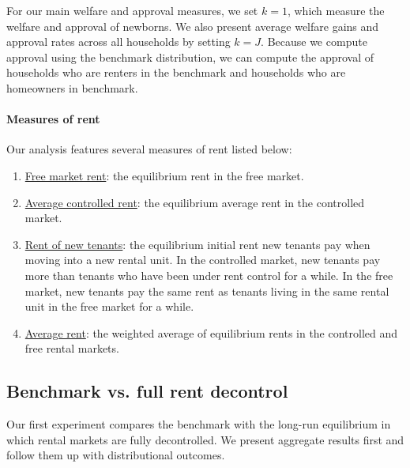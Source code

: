 \documentclass[parskip=full]{article}
\begin{document}
\noindent For our main welfare and approval measures, we set $k=1$, which measure the welfare and approval of newborns. We also present average welfare gains and approval rates across all households by setting $k=J$. Because we compute approval using the benchmark distribution, we can compute the approval of households who are renters in the benchmark and households who are homeowners in benchmark. 

\paragraph{Measures of rent} Our analysis features several measures of rent listed below: 

\begin{enumerate}
    \item \underline{Free market rent}: the equilibrium rent in the free market.
    \item \underline{Average controlled rent}: the equilibrium average rent in the controlled market.
    \item \underline{Rent of new tenants}: the equilibrium initial rent new tenants pay when moving into a new rental unit. In the controlled market, new tenants pay more than tenants who have been under rent control for a while. In the free market, new tenants pay the same rent as tenants living in the same rental unit in the free market for a while.
    \item \underline{Average rent}: the weighted average of equilibrium rents in the controlled and free rental markets.
\end{enumerate}

\subsection{Benchmark vs. full rent decontrol}\label{subsection:full_decontrol}
Our first experiment compares the benchmark with the long-run equilibrium in which rental markets are fully decontrolled. We present aggregate results first and follow them up with distributional outcomes.
\end{document}
